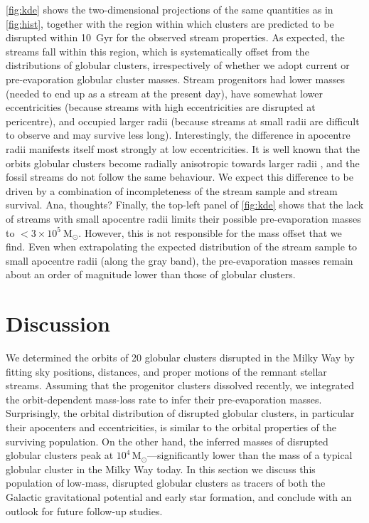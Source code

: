 \documentclass[twocolumn]{aastex63}
\newcommand{\msun}{\ensuremath{\textrm{M}_\odot}}
\begin{document}
\autoref{fig:kde} shows the two-dimensional projections of the same quantities as in \autoref{fig:hist}, together with the region within which clusters are predicted to be disrupted within 10~Gyr for the observed stream properties. As expected, the streams fall within this region, which is systematically offset from the distributions of globular clusters, irrespectively of whether we adopt current or pre-evaporation globular cluster masses. Stream progenitors had lower masses (needed to end up as a stream at the present day), have somewhat lower eccentricities (because streams with high eccentricities are disrupted at pericentre), and occupied larger radii (because streams at small radii are difficult to observe and may survive less long). Interestingly, the difference in apocentre radii manifests itself most strongly at low eccentricities. It is well known that the orbits globular clusters become radially anisotropic towards larger radii \citep[e.g.][]{dinescu99}, and the fossil streams do not follow the same behaviour. We expect this difference to be driven by a combination of incompleteness of the stream sample and stream survival. {\color{red}Ana, thoughts?} Finally, the top-left panel of \autoref{fig:kde} shows that the lack of streams with small apocentre radii limits their possible pre-evaporation masses to $<3\times10^5~\msun$. However, this is not responsible for the mass offset that we find. Even when extrapolating the expected distribution of the stream sample to small apocentre radii (along the gray band), the pre-evaporation masses remain about an order of magnitude lower than those of globular clusters.


\section{Discussion}
\label{sec:discussion}

We determined the orbits of 20 globular clusters disrupted in the Milky Way by fitting sky positions, distances, and proper motions of the remnant stellar streams.
Assuming that the progenitor clusters dissolved recently, we integrated the orbit-dependent mass-loss rate to infer their pre-evaporation masses.
Surprisingly, the orbital distribution of disrupted globular clusters, in particular their apocenters and eccentricities, is similar to the orbital properties of the surviving population.
On the other hand, the inferred masses of disrupted globular clusters peak at $10^4\,\msun$---significantly lower than the mass of a typical globular cluster in the Milky Way today.
In this section we discuss this population of low-mass, disrupted globular clusters as tracers of both the Galactic gravitational potential and early star formation, and conclude with an outlook for future follow-up studies.
\end{document}
